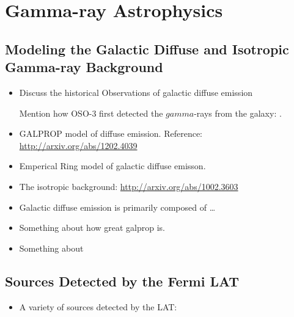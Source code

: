 
\chapter{Gamma-ray Astrophysics}







\section{Modeling the Galactic Diffuse and Isotropic Gamma-ray Background}

\begin{itemize}
  \item Discuss the historical Observations of galactic diffuse emission

    Mention how \ac{OSO-3} first detected the $gamma$-rays from the galaxy: .


  \item GALPROP model of diffuse emission.
  Reference: \url{http://arxiv.org/abs/1202.4039}
  \item Emperical Ring model of galactic diffuse emisson.
  \item The isotropic background: \url{http://arxiv.org/abs/1002.3603}
\end{itemize}

\begin{itemize}
  \item Galactic diffuse emission is primarily composed of \ldots
  \item Something about how great galprop is.
  \item Something about
\end{itemize}

\section{Sources Detected by the Fermi \acs{LAT}}

\begin{itemize}
  \item A variety of sources detected by the \acs{LAT}:
\end{itemize}

